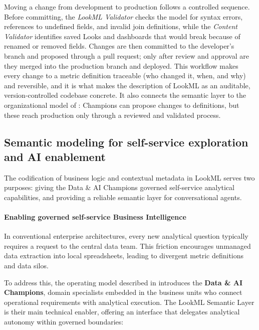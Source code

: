 Moving a change from development to production follows a controlled sequence. Before committing, the \textit{LookML Validator} checks the model for syntax errors, references to undefined fields, and invalid join definitions, while the \textit{Content Validator} identifies saved Looks and dashboards that would break because of renamed or removed fields. Changes are then committed to the developer's branch and proposed through a pull request; only after review and approval are they merged into the production branch and deployed.
This workflow makes every change to a metric definition traceable (who changed it, when, and why) and reversible, and it is what makes the description of LookML as an auditable, version-controlled codebase concrete. It also connects the semantic layer to the organizational model of : Champions can propose changes to definitions, but these reach production only through a reviewed and validated process.

\subsection{Semantic modeling for self-service exploration and AI enablement}
The codification of business logic and contextual metadata in LookML serves two purposes: giving the Data \& AI Champions governed self-service analytical capabilities, and providing a reliable semantic layer for conversational agents.

\paragraph{Enabling governed self-service Business Intelligence}
In conventional enterprise architectures, every new analytical question typically requires a request to the central data team. This friction encourages unmanaged data extraction into local spreadsheets, leading to divergent metric definitions and data silos.

To address this, the operating model described in  introduces the \textbf{Data \& AI Champions}, domain specialists embedded in the business units who connect operational requirements with analytical execution. The LookML Semantic Layer is their main technical enabler, offering an interface that delegates analytical autonomy within governed boundaries:

